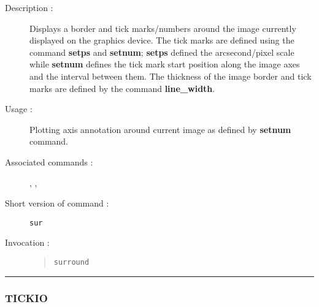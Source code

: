 \begin{description}

\item[Description :] Displays a border and tick marks/numbers around
the image currently displayed on the graphics device.  The tick marks
are defined using the command {\bf setps} and {\bf setnum}; {\bf setps}
defined the arcsecond/pixel scale while {\bf setnum} defines the tick
mark start position along the image axes and the interval between
them.  The thickness of the image border and tick marks are defined by
the command {\bf line\_width}.

\item[Usage :] Plotting axis annotation around current image as defined by 
{\bf setnum} command.

\item[Associated commands :] {\tt {}}, 
{\tt {}}, {\tt {}}

\item[Short version of command :] {\tt sur}
\item[Invocation :]

\begin{quote}{\tt  surround }\end{quote}

\end{description}

\hrule 
\subsubsection*{\label{TICKIO}TICKIO}

